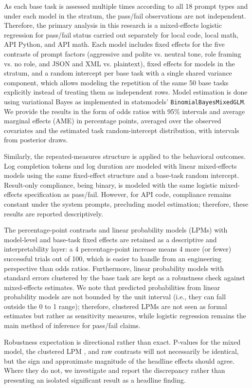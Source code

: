 \documentclass{llncs}
\begin{document}
As each base task is assessed multiple times according to all 18 prompt types and under each model in the stratum, the pass/fail observations are not independent. Therefore, the primary analysis in this research is a mixed-effects logistic regression for pass/fail status carried out separately for local code, local math, API Python, and API math. Each model includes fixed effects for the five contrasts of prompt factors (aggressive and polite vs. neutral tone, role framing vs. no role, and JSON and XML vs. plaintext), fixed effects for models in the stratum, and a random intercept per base task with a single shared variance component, which allows modeling the repetition of the same 50 base tasks explicitly instead of treating them as independent rows. Model estimation is done using variational Bayes as implemented in statsmodels' \texttt{BinomialBayesMixedGLM}. We provide the results in the form of odds ratios with 95\% intervals and average marginal effects (AME) in percentage points, averaged over the observed covariates and the estimated task random-intercept distribution, with intervals from posterior draws.

Similarly, the repeated-measures structure is applied to the behavioral outcomes. Log completion tokens and log duration are modeled with linear mixed-effects models using the same fixed-effect structure and a base-task random intercept. Result-only compliance, being binary, is modeled with the same logistic mixed-effects specification as pass/fail. However, for API code, compliance remains constant under the system prompts, precluding model estimation; therefore, these results are reported descriptively.

The percentage-point contrasts and linear probability models (LPMs) with model-level and base-task fixed effects are retained as a descriptive and interpretability layer: a 4 percentage-point increase means 4 more (or fewer) successful trials out of 100, which is easier to handle from an engineering perspective than odds ratios. Furthermore, linear probability models with standard errors clustered by the base task are kept as a robustness check against mixed-effects estimates. We note that predicted probabilities from linear probability models are not bounded by the unit interval (i.e., they can fall outside the 0 to 1 range); therefore, clustered LPMs are not seen as formal estimates but rather as sensitivity measures, while logistic regression remains the main method of inference for pass/fail claims.

Robustness expectation is directional rather than exact. P-values for the mixed model, the clustered LPM , and raw contrasts will not necessarily be identical, but the sign and approximate magnitude of the headline effects should agree. Where they do not, we investigate and report the discrepancy rather than presenting an isolated significant result as a headline finding.
\end{document}
